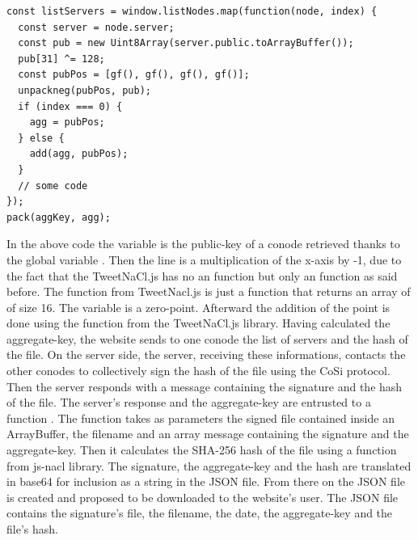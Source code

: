 \documentclass[11pt, a4paper, twoside, openright, openany]{article}
\begin{document}
\begin{lstlisting}[caption={Extract of the code calculating the aggregate-key}, captionpos=b]
const listServers = window.listNodes.map(function(node, index) {
  const server = node.server;
  const pub = new Uint8Array(server.public.toArrayBuffer());
  pub[31] ^= 128;
  const pubPos = [gf(), gf(), gf(), gf()];
  unpackneg(pubPos, pub);
  if (index === 0) {
    agg = pubPos;
  } else {
    add(agg, pubPos);
  }
  // some code
});
pack(aggKey, agg);
\end{lstlisting}

In the above code the variable  is the public-key of a conode retrieved thanks to
the global variable .
\newline
Then the line  is
a multiplication of the x-axis by -1, due to the fact that the TweetNaCl.js has no
an  function but only an  function as said before.
\newline
The function  from TweetNacl.js is just a function that returns an array
of  of size 16. The variable  is a zero-point.
\newline
Afterward the addition of the point is done using the  function from
the TweetNaCl.js library.
\newline \newline
Having calculated the aggregate-key, the website sends to one conode the list of servers
and the hash of the file. On the server side, the server, receiving these informations,
contacts the other conodes to collectively sign the hash of the file using the CoSi protocol.
Then the server responds with a message containing the signature
and the hash of the file. The server's response and the aggregate-key are entrusted to a function
.
\newline
The function takes as parameters the signed file contained inside an ArrayBuffer,
the filename and an array message containing the signature and the aggregate-key.
Then it calculates the SHA-256 hash of the file using a function from js-nacl library.
The signature, the aggregate-key and the hash are translated in base64 for inclusion
as a string in the JSON file.
\newline \newline
From there on the JSON file is created and proposed to be downloaded to the website's user.
The JSON file contains the signature's file, the filename, the date, the aggregate-key and the file's hash.
\bigbreak
\end{document}
